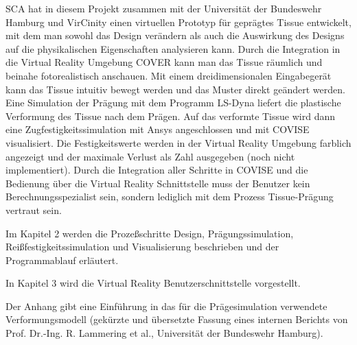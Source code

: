 SCA hat in diesem Projekt zusammen mit der Universit\"at der Bundeswehr
Hamburg und VirCinity einen virtuellen
Prototyp f\"ur gepr\"agtes Tissue entwickelt, mit dem man sowohl das Design
ver\"andern  als auch die Auswirkung des Designs auf die physikalischen
Eigenschaften analysieren kann. Durch die Integration in die Virtual
Reality Umgebung COVER kann man das Tissue r\"aumlich und beinahe fotorealistisch
anschauen. Mit einem dreidimensionalen Eingabeger\"at kann das Tissue
intuitiv bewegt werden und das Muster direkt ge\"andert werden. Eine Simulation
der Pr\"agung mit dem Programm LS-Dyna liefert die plastische Verformung des
Tissue nach dem Pr\"agen. Auf das verformte Tissue wird dann eine 
Zugfestigkeitssimulation  mit Ansys angeschlossen und mit COVISE visualisiert.
Die Festigkeitswerte werden in der Virtual Reality Umgebung farblich
angezeigt und der maximale Verlust als Zahl ausgegeben (noch nicht implementiert). 
Durch die Integration
aller Schritte in COVISE und die Bedienung \"uber die Virtual Reality
Schnittstelle muss der Benutzer kein Berechnungsspezialist sein, sondern
lediglich mit dem Prozess Tissue-Pr\"agung vertraut sein.

Im Kapitel 2 werden die 
Proze\ss schritte Design, Pr\"agungssimulation, Rei\ss festigkeitssimulation und 
Visualisierung beschrieben und der Programmablauf erl\"autert.\newline 

In Kapitel 3 wird die Virtual Reality Benutzerschnittstelle vorgestellt.\newline

Der Anhang gibt eine Einf\"uhrung in das f\"ur die Pr\"agesimulation verwendete
Verformungsmodell (gek\"urzte und \"ubersetzte Fassung eines internen 
Berichts von Prof. Dr.-Ing. R. Lammering et al., Universit\"at der Bundeswehr
Hamburg).


 

